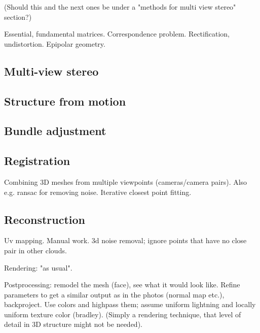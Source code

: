 (Should this and the next ones be under a "methods for multi view stereo" section?)

Essential, fundamental matrices. Correspondence problem. Rectification, undistortion. Epipolar geometry.

\subsection{Multi-view stereo}

\subsection{Structure from motion}

\subsection{Bundle adjustment}

\subsection{Registration}

Combining 3D meshes from multiple viewpoints (cameras/camera pairs). Also e.g. ransac for removing noise. Iterative closest point fitting.

\subsection{Reconstruction}

Uv mapping. Manual work. 3d noise removal; ignore points that have no close pair in other clouds.

Rendering: "as usual".

Postprocessing: remodel the mesh (face), see what it would look like. Refine parameters to get a similar output as in the photos (normal map etc.), backproject. Use colors and highpass them; assume uniform lightning and locally uniform texture color (bradley). (Simply a rendering technique, that level of detail in 3D structure might not be needed).


